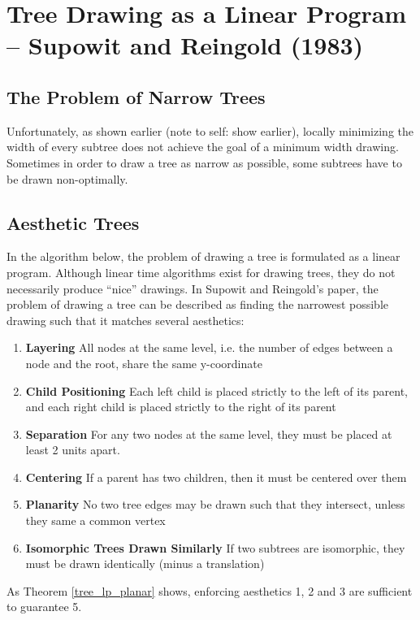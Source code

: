 \documentclass[11pt]{report}
\begin{document}
\section{Tree Drawing as a Linear Program -- Supowit and Reingold (1983)}
\subsection{The Problem of Narrow Trees}
Unfortunately, as shown earlier (note to self: show earlier), locally minimizing the width of every subtree does not achieve the goal of a minimum width drawing. Sometimes in order to draw a tree as narrow as possible, some subtrees have to be drawn non-optimally.

\subsection{Aesthetic Trees}

In the algorithm below, the problem of drawing a tree is formulated as a linear program.\cite{supowit1983complexity} Although linear time algorithms exist for drawing trees, they do not necessarily produce ``nice'' drawings. In Supowit and Reingold's paper, the problem of drawing a tree can be described as finding the narrowest possible drawing such that it matches several aesthetics:
\begin{enumerate}
    \item \textbf{Layering} All nodes at the same level, i.e. the number of edges between a node and the root, share the same y-coordinate
    \item \textbf{Child Positioning} Each left child is placed strictly to the left of its parent, and each right child is placed strictly to the right of its parent
    \item \textbf{Separation} For any two nodes at the same level, they must be placed at least 2 units apart.
    \item \textbf{Centering} If a parent has two children, then it must be centered over them
    \item \textbf{Planarity} No two tree edges may be drawn such that they intersect, unless they same a common vertex
    \item \textbf{Isomorphic Trees Drawn Similarly} If two subtrees are isomorphic, they must be drawn identically (minus a translation)
\end{enumerate}

As Theorem \ref{tree_lp_planar} shows, enforcing aesthetics 1, 2 and 3 are sufficient to guarantee 5.
\end{document}

